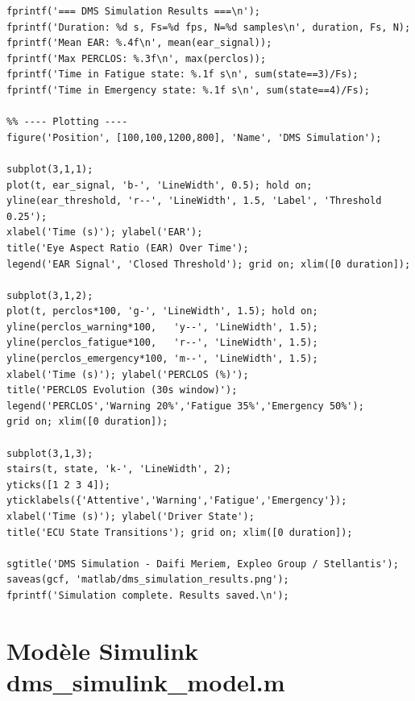 \documentclass[12pt,a4paper]{report}
\begin{document}
\begin{lstlisting}[style=matlab, caption={dms\_simulation.m -- simulation compl\`ete},
  label=lst:matlab_full]
%% ---- Statistics ----
fprintf('=== DMS Simulation Results ===\n');
fprintf('Duration: %d s, Fs=%d fps, N=%d samples\n', duration, Fs, N);
fprintf('Mean EAR: %.4f\n', mean(ear_signal));
fprintf('Max PERCLOS: %.3f\n', max(perclos));
fprintf('Time in Fatigue state: %.1f s\n', sum(state==3)/Fs);
fprintf('Time in Emergency state: %.1f s\n', sum(state==4)/Fs);

%% ---- Plotting ----
figure('Position', [100,100,1200,800], 'Name', 'DMS Simulation');

subplot(3,1,1);
plot(t, ear_signal, 'b-', 'LineWidth', 0.5); hold on;
yline(ear_threshold, 'r--', 'LineWidth', 1.5, 'Label', 'Threshold 0.25');
xlabel('Time (s)'); ylabel('EAR');
title('Eye Aspect Ratio (EAR) Over Time');
legend('EAR Signal', 'Closed Threshold'); grid on; xlim([0 duration]);

subplot(3,1,2);
plot(t, perclos*100, 'g-', 'LineWidth', 1.5); hold on;
yline(perclos_warning*100,   'y--', 'LineWidth', 1.5);
yline(perclos_fatigue*100,   'r--', 'LineWidth', 1.5);
yline(perclos_emergency*100, 'm--', 'LineWidth', 1.5);
xlabel('Time (s)'); ylabel('PERCLOS (%)');
title('PERCLOS Evolution (30s window)');
legend('PERCLOS','Warning 20%','Fatigue 35%','Emergency 50%');
grid on; xlim([0 duration]);

subplot(3,1,3);
stairs(t, state, 'k-', 'LineWidth', 2);
yticks([1 2 3 4]);
yticklabels({'Attentive','Warning','Fatigue','Emergency'});
xlabel('Time (s)'); ylabel('Driver State');
title('ECU State Transitions'); grid on; xlim([0 duration]);

sgtitle('DMS Simulation - Daifi Meriem, Expleo Group / Stellantis');
saveas(gcf, 'matlab/dms_simulation_results.png');
fprintf('Simulation complete. Results saved.\n');
\end{lstlisting}

\section{Mod\`ele Simulink dms\_simulink\_model.m}
\end{document}
